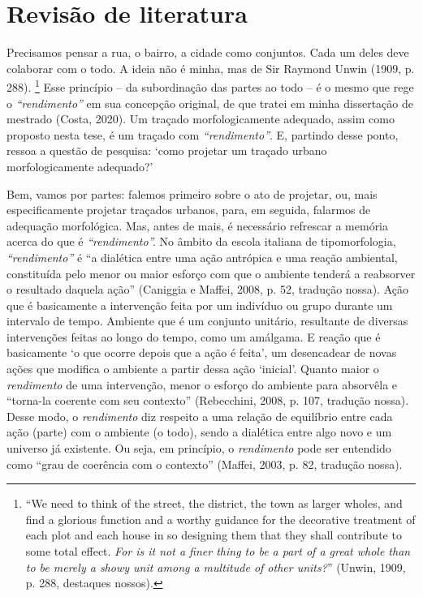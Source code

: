 \documentclass[12pt, a4paper]{book} %
\begin{document}
        \chapter[O traçado da cidade]{Revisão de literatura}

        Precisamos pensar a rua, o bairro, a cidade como conjuntos. Cada um deles deve colaborar com o todo. A ideia não é minha, mas de Sir Raymond Unwin (1909, p. 288). 
            \footnote[10]{``We need to think of the street, the district, the town as larger wholes, and find a glorious function and a worthy guidance for the decorative treatment of each plot and each house in so designing them that they shall contribute to some total effect. \textit{For is it not a finer thing to be a part of a great whole than to be merely a showy unit among a multitude of other units?}'' (Unwin, 1909, p. 288, destaques nossos).}
        Esse princípio – da subordinação das partes ao todo – é o mesmo que rege o \textit{``rendimento''} em sua concepção original, de que tratei em minha dissertação de mestrado (Costa, 2020). Um traçado morfologicamente adequado, assim como proposto nesta tese, é um traçado com \textit{``rendimento''}. E, partindo desse ponto, ressoa a questão de pesquisa: `como projetar um traçado urbano morfologicamente adequado?'

        Bem, vamos por partes: falemos primeiro sobre o ato de projetar, ou, mais especificamente projetar traçados urbanos, para, em seguida, falarmos de adequação morfológica. Mas, antes de mais, é necessário refrescar a memória acerca do que é \textit{``rendimento''.} No âmbito da escola italiana de tipomorfologia, \textit{``rendimento''} é ``a dialética entre uma ação antrópica e uma reação ambiental, constituída pelo menor ou maior esforço com que o ambiente tenderá a reabsorver o resultado daquela ação'' (Caniggia e Maffei, 2008, p. 52, tradução nossa). Ação que é basicamente a intervenção feita por um indivíduo ou grupo durante um intervalo de tempo. Ambiente que é um conjunto unitário, resultante de diversas intervenções feitas ao longo do tempo, como um amálgama. E reação que é basicamente `o que ocorre depois que a ação é feita', um desencadear de novas ações que modifica o ambiente a partir dessa ação `inicial'. Quanto maior o \textit{rendimento} de uma intervenção, menor o esforço do ambiente para absorvêla e ``torna-la coerente com seu contexto'' (Rebecchini, 2008, p. 107, tradução nossa). Desse modo, o \textit{rendimento} diz respeito a uma relação de equilíbrio entre cada ação (parte) com o ambiente (o todo), sendo a dialética entre algo novo e um universo já existente. Ou seja, em princípio, o \textit{rendimento} pode ser entendido como ``grau de coerência com o contexto'' (Maffei, 2003, p. 82, tradução nossa).
\end{document}
